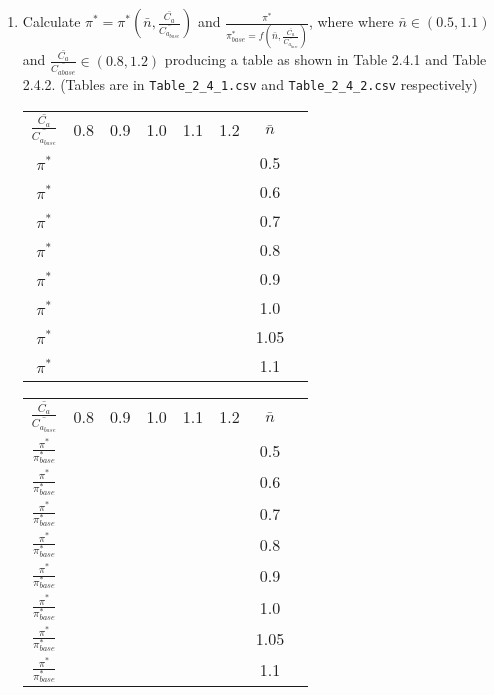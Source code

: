 \documentclass[12pt,english]{article}
\begin{document}
\begin{enumerate}
    \item Calculate $\pi^{*} = \pi^{*} (\bar{n}, \frac{\bar{C_{a}}}{\bar{C_{a_{base}}}})$ and $\frac{\pi^{*}}{\pi^{*}_{base} = f (\bar{n}, \frac{\bar{C_{a}}}{\bar{C_{a_{base}}}})}$, where where $\bar{n} \in (0.5, 1.1)$ and $\frac{\bar{C_a}}{\bar{C_{a base}}} \in (0.8, 1.2)$ producing a table as shown in Table 2.4.1 and Table 2.4.2. (Tables are in \verb|Table_2_4_1.csv| and \verb|Table_2_4_2.csv| respectively)
    \begin{center}
        \begin{tabular}{ c c c c c c c c }
            $\frac{\bar{C_{a}}}{\bar{C_{a_{base}}}}$ & 0.8 & 0.9 & 1.0 & 1.1 & 1.2 & $\bar{n}$ \\
            $\pi^{*}$ & & & & & & 0.5 \\
            $\pi^{*}$ & & & & & & 0.6 \\
            $\pi^{*}$ & & & & & & 0.7 \\
            $\pi^{*}$ & & & & & & 0.8 \\
            $\pi^{*}$ & & & & & & 0.9 \\
            $\pi^{*}$ & & & & & & 1.0 \\
            $\pi^{*}$ & & & & & & 1.05 \\
            $\pi^{*}$ & & & & & & 1.1 \\
        \end{tabular}

        \vspace*{3pt}

        \begin{tabular}{c c c c c c c c }
            $\frac{\bar{C_{a}}}{\bar{C_{a_{base}}}}$ & 0.8 & 0.9 & 1.0 & 1.1 & 1.2 & $\bar{n}$ \\
            $\frac{\pi^{*}}{\pi^{*}_{base}}$ & & & & & & 0.5 \\
            $\frac{\pi^{*}}{\pi^{*}_{base}}$ & & & & & & 0.6 \\
            $\frac{\pi^{*}}{\pi^{*}_{base}}$ & & & & & & 0.7 \\
            $\frac{\pi^{*}}{\pi^{*}_{base}}$ & & & & & & 0.8 \\
            $\frac{\pi^{*}}{\pi^{*}_{base}}$ & & & & & & 0.9 \\
            $\frac{\pi^{*}}{\pi^{*}_{base}}$ & & & & & & 1.0 \\
            $\frac{\pi^{*}}{\pi^{*}_{base}}$ & & & & & & 1.05 \\
            $\frac{\pi^{*}}{\pi^{*}_{base}}$ & & & & & & 1.1 \\
        \end{tabular}
    \end{center}


\end{enumerate}
\end{document}
